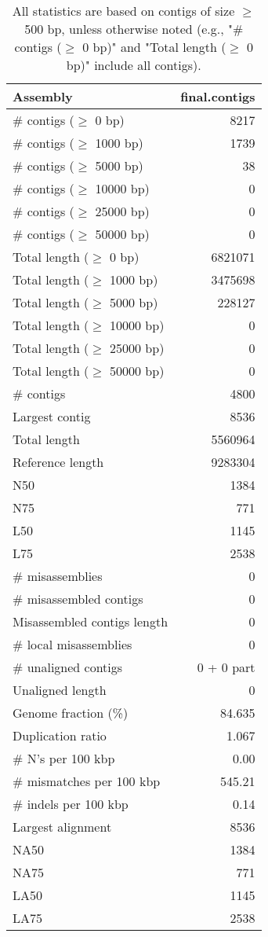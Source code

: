 \documentclass[12pt,a4paper]{article}
\begin{document}
\begin{table}[ht]
\begin{center}
\caption{All statistics are based on contigs of size $\geq$ 500 bp, unless otherwise noted (e.g., "\# contigs ($\geq$ 0 bp)" and "Total length ($\geq$ 0 bp)" include all contigs).}
\begin{tabular}{|l*{1}{|r}|}
\hline
Assembly & final.contigs \\ \hline
\# contigs ($\geq$ 0 bp) & 8217 \\ \hline
\# contigs ($\geq$ 1000 bp) & 1739 \\ \hline
\# contigs ($\geq$ 5000 bp) & 38 \\ \hline
\# contigs ($\geq$ 10000 bp) & 0 \\ \hline
\# contigs ($\geq$ 25000 bp) & 0 \\ \hline
\# contigs ($\geq$ 50000 bp) & 0 \\ \hline
Total length ($\geq$ 0 bp) & 6821071 \\ \hline
Total length ($\geq$ 1000 bp) & 3475698 \\ \hline
Total length ($\geq$ 5000 bp) & 228127 \\ \hline
Total length ($\geq$ 10000 bp) & 0 \\ \hline
Total length ($\geq$ 25000 bp) & 0 \\ \hline
Total length ($\geq$ 50000 bp) & 0 \\ \hline
\# contigs & 4800 \\ \hline
Largest contig & 8536 \\ \hline
Total length & 5560964 \\ \hline
Reference length & 9283304 \\ \hline
N50 & 1384 \\ \hline
N75 & 771 \\ \hline
L50 & 1145 \\ \hline
L75 & 2538 \\ \hline
\# misassemblies & 0 \\ \hline
\# misassembled contigs & 0 \\ \hline
Misassembled contigs length & 0 \\ \hline
\# local misassemblies & 0 \\ \hline
\# unaligned contigs & 0 + 0 part \\ \hline
Unaligned length & 0 \\ \hline
Genome fraction (\%) & 84.635 \\ \hline
Duplication ratio & 1.067 \\ \hline
\# N's per 100 kbp & 0.00 \\ \hline
\# mismatches per 100 kbp & 545.21 \\ \hline
\# indels per 100 kbp & 0.14 \\ \hline
Largest alignment & 8536 \\ \hline
NA50 & 1384 \\ \hline
NA75 & 771 \\ \hline
LA50 & 1145 \\ \hline
LA75 & 2538 \\ \hline
\end{tabular}
\end{center}
\end{table}
\end{document}
